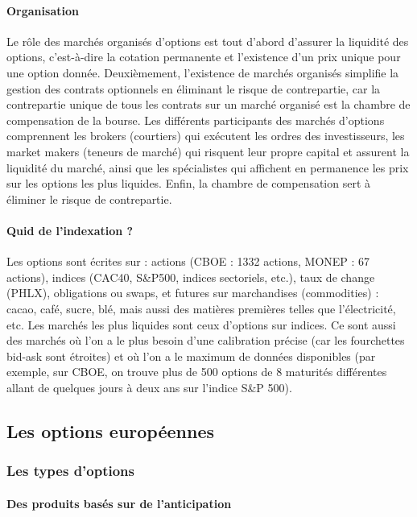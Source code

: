 \documentclass[a4paper, 12pt]{report}
\begin{document}
\paragraph{Organisation}

Le rôle des marchés organisés d’options est tout d’abord d’assurer la liquidité des options, c'est-à-dire la cotation permanente et l’existence d’un prix unique pour une option donnée. Deuxièmement, l’existence de marchés organisés simplifie la gestion des contrats optionnels en éliminant le risque de contrepartie, car la contrepartie unique de tous les contrats sur un marché organisé est la chambre de compensation de la bourse. Les différents participants des marchés d’options comprennent les brokers (courtiers) qui exécutent les ordres des investisseurs, les market makers (teneurs de marché) qui risquent leur propre capital et assurent la liquidité du marché, ainsi que les spécialistes qui affichent en permanence les prix sur les options les plus liquides. Enfin, la chambre de compensation sert à éliminer le risque de contrepartie.

\paragraph{Quid de l’indexation ?} 

Les options sont écrites sur : actions (CBOE : 1332 actions, MONEP : 67 actions), indices (CAC40, S\&P500, indices sectoriels, etc.), taux de change (PHLX), obligations ou swaps, et futures sur marchandises (commodities) : cacao, café, sucre, blé, mais aussi des matières premières telles que l’électricité, etc. Les marchés les plus liquides sont ceux d’options sur indices. Ce sont aussi des marchés où l’on a le plus besoin d’une calibration précise (car les fourchettes bid-ask sont étroites) et où l’on a le maximum de données disponibles (par exemple, sur CBOE, on trouve plus de 500 options de 8 maturités différentes allant de quelques jours à deux ans sur l’indice S\&P 500).

\subsection{Les options européennes}

\subsubsection{Les types d’options}

\paragraph{Des produits basés sur de l’anticipation}
\end{document}
